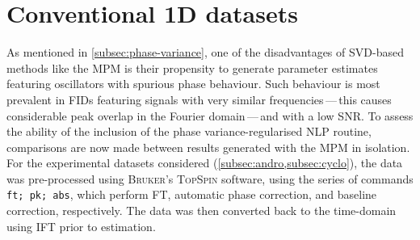 \section{Conventional \ac{1D} datasets}
\label{sec:evaluation}

As mentioned in \cref{subsec:phase-variance}, one of the disadvantages of
\ac{SVD}-based methods like the \ac{MPM} is their propensity to generate
parameter estimates featuring oscillators with spurious phase behaviour. Such
behaviour is most prevalent in \acp{FID} featuring signals with very similar
frequencies\,---\,this causes considerable peak overlap in the Fourier
domain\,---\,and with a low \ac{SNR}. To assess the ability of the inclusion of the
phase variance-regularised \ac{NLP} routine,
comparisons are now made between results generated with the \ac{MPM} in
isolation. For
the experimental datasets considered (\cref{subsec:andro,subsec:cyclo}), the
data was pre-processed using \textsc{Bruker}'s \textsc{TopSpin} software, using
the series of commands \texttt{ft; pk; abs}, which perform \ac{FT}, automatic
phase correction, and baseline correction, respectively. The data was then
converted back to the time-domain using \ac{IFT} prior to estimation.

